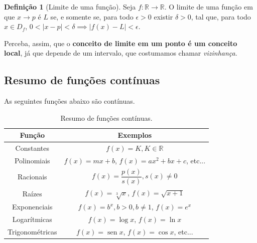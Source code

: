 \documentclass[12pt,openright,twoside,a4paper]{article}
\theoremstyle{definition}
\newtheorem{definition}{Definição}[section]
\renewcommand{\sin}{\operatorname{sen}} %
\begin{document}
	
	\begin{definition}[Limite de uma função]
		Seja $f: \mathbb{R} \longrightarrow \mathbb{R}$. O limite de uma função em que $x \to p$ é $L$ se, e somente se, para todo $\epsilon > 0$ existir $\delta > 0$, tal que, para todo $x \in D_f$, $0 < | x - p |  < \delta \implies |f(x) - L | < \epsilon$.
	\end{definition}
	
	Perceba, assim, que o \textbf{conceito de limite em um ponto é um conceito local}, já que depende de um intervalo, que costumamos chamar \textit{vizinhança}.
	
	\subsection{Resumo de funções contínuas}
	
	As seguintes funções  abaixo são contínuas.
	
	\renewcommand{\arraystretch}{1.5}
	\begin{table}[h]
		\caption{Resumo de funções contínuas.}
		\centering
		\begin{tabular}[t]{|c|c|}
			\hline
			Função & Exemplos \\
			\hline
			Constantes & $f(x) = K, K \in \mathbb{R}$ \\
			\hline
			Polinomiais & $f(x) = mx + b$, $f(x) = ax^2 + bx + c$, etc...\\
			\hline
			Racionais & $f(x) = \dfrac{p(x)}{s(x)}, s(x) \neq 0$\\
			\hline
			Raízes & $f(x) = \sqrt[3]{x}$, $f(x) = \sqrt{x+1}$\\
			\hline
			Exponenciais & $f(x) = b^x, b >0, b\neq 1$, $f(x) = e^x$\\
			\hline
			Logarítmicas & $f(x) = \log x$, $f(x) = \ln{x}$\\
			\hline
			Trigonométricas & $f(x) = \sin x $, $f(x) = \cos x$, etc...\\
			\hline
		\end{tabular}
	\end{table}
	\renewcommand{\arraystretch}{1}
	
\end{document}
